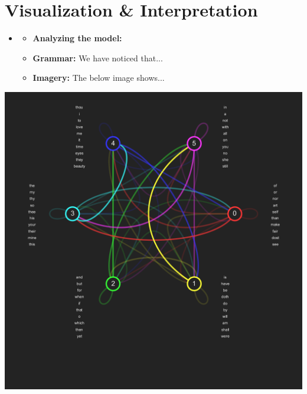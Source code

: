 \section{Visualization \& Interpretation}
\medskip
\begin{itemize}

    
    \item {}

    \begin{itemize}
    \item \textbf{Analyzing the model:}
    \item \textbf{Grammar:} We have noticed that...
    \item \textbf{Imagery:} The below image shows...
    \end{itemize}

\end{itemize}
\begin{center}
\includegraphics[scale=.4]{states.png}
\end{center}

